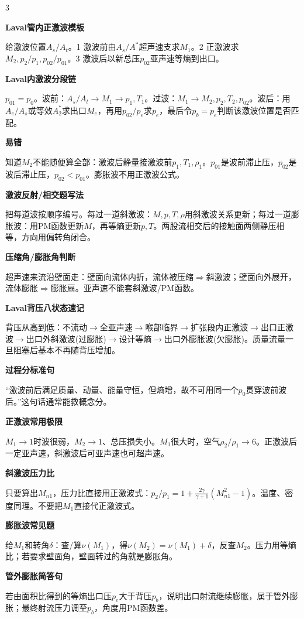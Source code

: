 \documentclass[a4paper]{article}
\newcommand{\qt}[1]{\vspace{0.25pt}\colorbox{Q}{\parbox{\dimexpr\linewidth-2\fboxsep}{\color{white}\bfseries #1}}\par}
\newcommand{\sect}[1]{\qt{#1}}
\begin{document}
\begin{multicols}{3}
{\sect{Laval管内正激波模板}
给激波位置$A_s/A_t$。1 激波前由$A_s/A^*$超声速支求$M_1$。2 正激波求$M_2,p_2/p_1,p_{02}/p_{01}$。3 激波后以新总压$p_{02}$亚声速等熵到出口。
\sect{Laval内激波分段链}
$p_{01}=p_0$。波前：$A_s/A_t\to M_1\to p_1,T_1$。过波：$M_1\to M_2,p_2,T_2,p_{02}$。波后：用$A_e/A_s$或等效$A^*_2$求出口$M_e$，再用$p_{02}/p_e$求$p_e$，最后令$p_b=p_e$判断该激波位置是否匹配。

\sect{易错}
知道$M_2$不能随便算全部：激波后静量接激波前$p_1,T_1,\rho_1$。$p_{01}$是波前滞止压，$p_{02}$是波后滞止压，$p_{02}<p_{01}$。膨胀波不用正激波公式。
\sect{激波反射/相交题写法}
把每道波按顺序编号。每过一道斜激波：$M,p,T,\rho$用斜激波关系更新；每过一道膨胀波：用PM函数更新$M$，再等熵更新$p,T$。两股流相交后的接触面两侧静压相等，方向用偏转角闭合。
\sect{压缩角/膨胀角判断}
超声速来流沿壁面走：壁面向流体内折，流体被压缩$\Rightarrow$斜激波；壁面向外展开，流体膨胀$\Rightarrow$膨胀扇。亚声速不能套斜激波/PM函数。
\sect{Laval背压八状态速记}
背压从高到低：不流动$\to$全亚声速$\to$喉部临界$\to$扩张段内正激波$\to$出口正激波$\to$出口外斜激波(过膨胀)$\to$设计等熵$\to$出口外膨胀波(欠膨胀)。质量流量一旦阻塞后基本不再随背压增加。
\sect{过程分标准句}
“激波前后满足质量、动量、能量守恒，但熵增，故不可用同一个$p_0$贯穿波前波后。”这句话通常能救概念分。
\sect{正激波常用极限}
$M_1\to1$时波很弱，$M_2\to1$、总压损失小。$M_1$很大时，空气$\rho_2/\rho_1\to6$。正激波后一定亚声速，斜激波后可亚声速也可超声速。
\sect{斜激波压力比}
只要算出$M_{n1}$，压力比直接用正激波式：$p_2/p_1=1+\frac{2\gamma}{\gamma+1}(M_{n1}^2-1)$。温度、密度同理。不要把$M_1$直接代正激波式。
\sect{膨胀波常见题}
给$M_1$和转角$\delta$：查/算$\nu(M_1)$，得$\nu(M_2)=\nu(M_1)+\delta$，反查$M_2$。压力用等熵比；若要求壁面角，壁面转过的角就是膨胀角。
\sect{管外膨胀简答句}
若由面积比得到的等熵出口压$p_e$大于背压$p_b$，说明出口射流继续膨胀，属于管外膨胀；最终射流压力调至$p_b$，角度用PM函数差。
}


\end{multicols}
\end{document}
